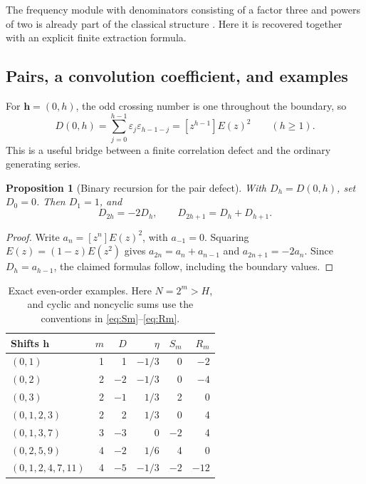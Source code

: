 \documentclass[11pt,oneside]{article}
\numberwithin{equation}{section}
\newtheorem{proposition}[theorem]{Proposition}
\theoremstyle{definition}
\theoremstyle{remark}
\newcommand{\eps}{\varepsilon}
\begin{document}
The frequency module with denominators consisting of a factor three and powers
of two is already part of the classical structure \cite{baakecoons}. Here it
is recovered together with an explicit finite extraction formula.

\subsection{Pairs, a convolution coefficient, and examples}
For \(\bm h=(0,h)\), the odd crossing number is one throughout the boundary,
so
\begin{equation}
 D(0,h)=\sum_{j=0}^{h-1}\eps_j\eps_{h-1-j}
       =[z^{h-1}]E(z)^2\qquad(h\ge1).
 \label{eq:pairD}
\end{equation}
This is a useful bridge between a finite correlation defect and the ordinary
generating series.

\begin{proposition}[Binary recursion for the pair defect]
With \(D_h=D(0,h)\), set \(D_0=0\). Then \(D_1=1\), and
\begin{equation}
 D_{2h}=-2D_h,\qquad D_{2h+1}=D_h+D_{h+1}.
 \label{eq:Drec}
\end{equation}
\end{proposition}
\begin{proof}
Write \(a_n=[z^n]E(z)^2\), with \(a_{-1}=0\). Squaring
\(E(z)=(1-z)E(z^2)\) gives
\(a_{2n}=a_n+a_{n-1}\) and \(a_{2n+1}=-2a_n\).
Since \(D_h=a_{h-1}\), the claimed formulas follow, including the boundary
values.
\end{proof}

\begin{table}[htbp]
\centering
\caption{Exact even-order examples. Here \(N=2^m>H\), and cyclic and
noncyclic sums use the conventions in \eqref{eq:Sm}--\eqref{eq:Rm}.}
\label{tab:corr}
\begin{tabular}{@{}lrrrrr@{}}
\toprule
Shifts \(\bm h\)&\(m\)&\(D\)&\(\eta\)&\(S_m\)&\(R_m\)\\
\midrule
\((0,1)\)&1&1&\(-1/3\)&0&\(-2\)\\
\((0,2)\)&2&\(-2\)&\(-1/3\)&0&\(-4\)\\
\((0,3)\)&2&\(-1\)&\(1/3\)&2&0\\
\((0,1,2,3)\)&2&2&\(1/3\)&0&4\\
\((0,1,3,7)\)&3&\(-3\)&0&\(-2\)&4\\
\((0,2,5,9)\)&4&\(-2\)&\(1/6\)&4&0\\
\((0,1,2,4,7,11)\)&4&\(-5\)&\(-1/3\)&\(-2\)&\(-12\)\\
\bottomrule
\end{tabular}
\end{table}
\end{document}
